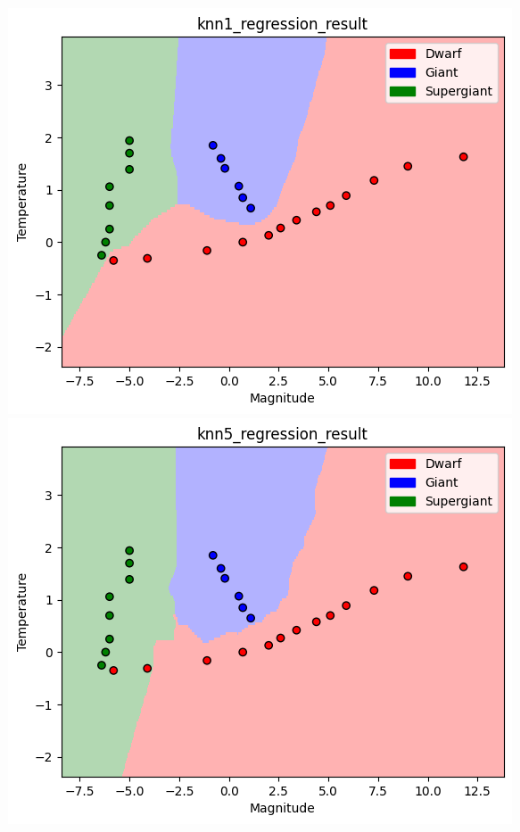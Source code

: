 \documentclass[submit]{harvardml}
\begin{document}
\begin{enumerate}
     \includegraphics[scale=0.4]{hw2/images/knn1_regression.png}
     \includegraphics[scale=0.4]{hw2/images/knn5_regression.png}\\
     \\

\end{enumerate}
\end{document}
